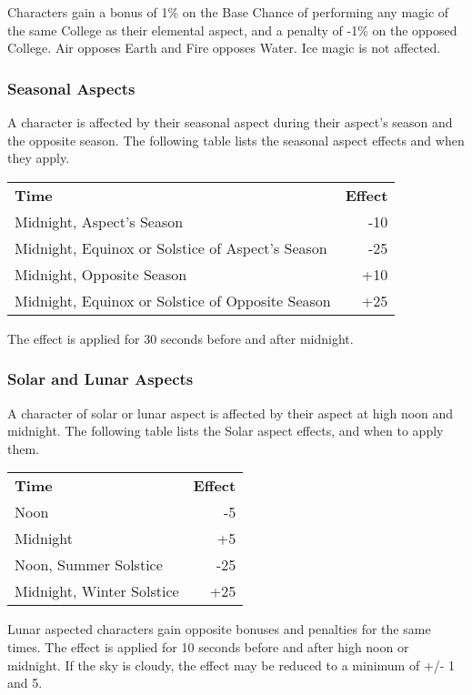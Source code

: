 \begin{multicols*}{3}
Characters gain a bonus of 1\% on the Base Chance of performing any
magic of the same College as their elemental aspect, and a penalty of
-1\% on the opposed College. Air opposes Earth and Fire opposes
Water. Ice magic is not affected.

\subsubsection{Seasonal Aspects}

A character is affected by their seasonal aspect during their aspect's
season and the opposite season. The following table lists the seasonal
aspect effects and when they apply.

\begin{tabularx}{\linewidth}{Xr}
\textbf{Time} & \textbf{Effect} \\
Midnight, Aspect's Season & -10 \\
Midnight, Equinox or Solstice of Aspect's Season & -25 \\
Midnight, Opposite Season & +10 \\
Midnight, Equinox or Solstice of Opposite Season & +25 \\
\end{tabularx}

The effect is applied for 30 seconds before and after midnight.

\subsubsection{Solar and Lunar Aspects}

A character of solar or lunar aspect is affected by their aspect at
high noon and midnight. The following table lists the Solar aspect
effects, and when to apply them.

\begin{tabularx}{\linewidth}{Xr}
\textbf{Time} & \textbf{Effect} \\
Noon				& -5 \\
Midnight			& +5 \\
Noon, Summer Solstice		& -25 \\
Midnight, Winter Solstice	& +25 \\
\end{tabularx}

Lunar aspected characters gain opposite bonuses and penalties for the
same times. The effect is applied for 10 seconds before and after high
noon or midnight. If the sky is cloudy, the effect may be reduced to a
minimum of +/- 1 and 5.


\end{multicols*}
